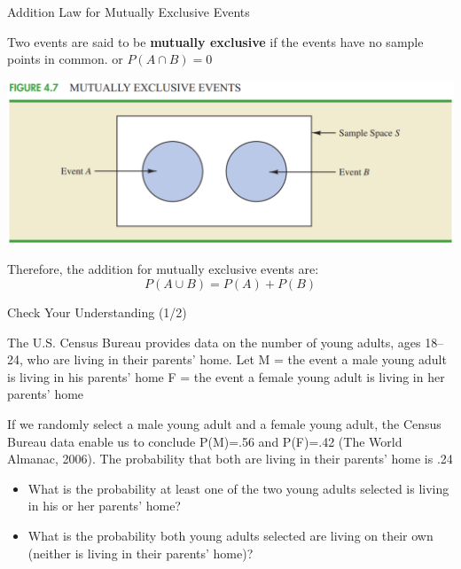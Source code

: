 \documentclass{beamer}
\begin{document}
\begin{frame}{Addition Law for Mutually Exclusive Events}

Two events are said to be \textbf{mutually exclusive} if the events have no sample points in common. or $P(A \cap B) = 0$ 

\vspace{0.4 cm}

\includegraphics[scale=0.4]{images/ch3MutuallyExclusiveEvents.png}

\vspace{0.3 cm}
Therefore, the addition for mutually exclusive events are: 
$$ P(A \cup B) = P(A) + P(B)$$ 

\end{frame}


\begin{frame}{Check Your Understanding (1/2)}

The U.S. Census Bureau provides data on the number of young adults, ages 18–24, who are living in their parents’ home. Let
\vspace{0.3 cm}
\linebreak
M = the event a male young adult is living in his parents’ home
\linebreak
F = the event a female young adult is living in her parents’ home
\vspace{0.3 cm}

If we randomly select a male young adult and a female young adult, the Census Bureau data enable us to conclude P(M)=.56 and P(F)=.42 (The World Almanac, 2006). The
probability that both are living in their parents’ home is .24

\begin{itemize}
\item  What is the probability at least one of the two young adults selected is living in his or her parents’ home?
\item What is the probability both young adults selected are living on their own (neither is living in their parents’ home)?
\end{itemize}

\end{frame}
\end{document}

